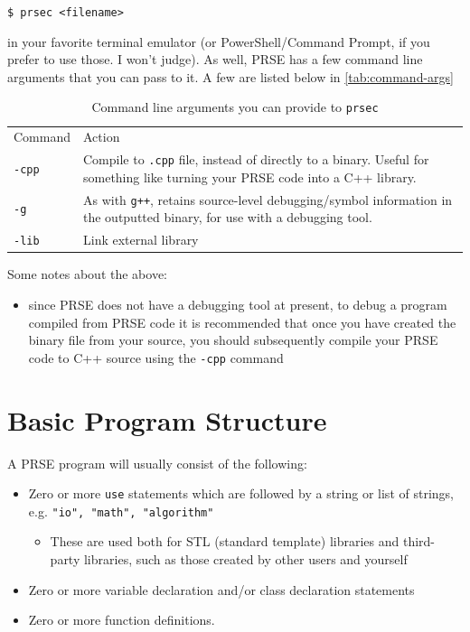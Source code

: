 \documentclass[letterpaper, 12pt]{article}
\begin{document}
\texttt{\$ prsec <filename>}\linebreak

in your favorite terminal emulator (or PowerShell/Command Prompt, if you prefer to use those. I
won't judge). As well, PRSE has a few command line arguments that you can pass to it. A few are
listed below in \autoref{tab:command-args}

\begin{table}[h]
   \centering
   \captionsetup{justification=centering}
   \caption{Command line arguments you can provide to \texttt{prsec}}
   \rule{0pt}{0.5cm} 
   \begin{tabularx}{400pt}{|X|X|}
      \hline
      Command            & Action           \\
      \texttt{-cpp}      & Compile to \texttt{.cpp} file, instead of directly to a binary. Useful for
                           something like turning your PRSE code into a C++ library. \\
      \texttt{-g}        & As with \texttt{g++}, retains source-level debugging/symbol information in the
                           outputted binary, for use with a debugging tool.\\
      \texttt{-lib}      & Link external library \\
      \hline
   \end{tabularx}
   \label{tab:command-args}
\end{table}

Some notes about the above:
\begin{itemize}
   \item since PRSE does not have a debugging tool at present, to debug a program compiled from PRSE
      code it is recommended that once you have created the binary file from your source, you should
      subsequently compile your PRSE code to C++ source using the \texttt{-cpp} command
\end{itemize}

\newpage

\section{Basic Program Structure}

A PRSE program will usually consist of the following:

\begin{itemize}
\item Zero or more \texttt{use} statements which are followed by a string or list of strings, e.g. \texttt{"io", "math", "algorithm"}
\begin{itemize}
   \item These are used both for STL (standard template) libraries and third-party libraries, such as those created by other users and yourself
\end{itemize}
\item Zero or more variable declaration and/or class declaration statements
\item Zero or more function definitions. 
\end{itemize}
\end{document}
